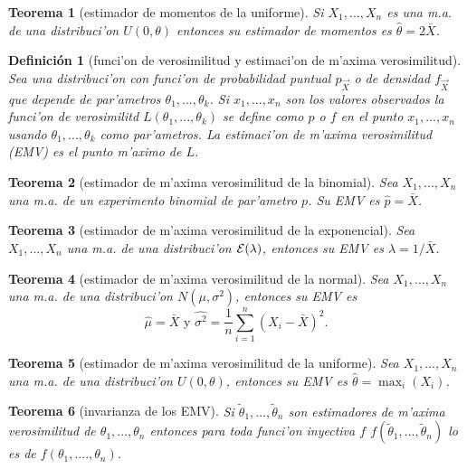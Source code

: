\documentclass[a4paper,spanish]{article}
\newcommand{\expon}[0]{{\cal E}}
\newtheorem{teo}{Teorema}
\newtheorem{defi}{Definici\'on}
\begin{document}
\begin{teo}[estimador de momentos de la uniforme]
Si $X_1,...,X_n$ es una m.a. de una distribuci'on $U(0,\theta)$ entonces
su estimador de momentos es $\hat{\theta} = 2\bar{X}$.
\end{teo}

\begin{defi}[funci'on de verosimilitud y estimaci'on de m'axima verosimilitud]
Sea una distribuci'on con funci'on de probabilidad puntual $p_{\vec{X}}$ o de
densidad $f_{\vec{X}}$ que depende de par'ametros $\theta_1,...,\theta_k$. Si
$x_1,...,x_n$ son los valores observados la \emph{funci'on de verosimilitd}
$L(\theta_1,...,\theta_k)$ se define como $p$ o $f$ en el punto $x_1,...,x_n$
usando $\theta_1,...,\theta_k$ como par'ametros. La \emph{estimaci'on de
m'axima verosimilitud (EMV)} es el punto m'aximo de $L$.
\end{defi}

\begin{teo}[estimador de m'axima verosimilitud de la binomial]
Sea $X_1,...,X_n$ una m.a. de un experimento binomial de par'ametro $p$.
Su EMV es $\hat{p} = \bar{X}$.
\end{teo}

\begin{teo}[estimador de m'axima verosimilitud de la exponencial]
Sea $X_1,...,X_n$ una m.a. de una distribuci'on $\expon(\lambda)$, entonces
su EMV es $\hat{\lambda} = 1 / \bar{X}$.
\end{teo}

\begin{teo}[estimador de m'axima verosimilitud de la normal]
Sea $X_1,...,X_n$ una m.a. de una distribuci'on $N(\mu,\sigma^2)$, entonces
su EMV es 
$$\hat{\mu} = \bar{X} \mbox{\ \ y \ \ } 
	\hat{\sigma^2} = \frac{1}{n} \sum_{i=1}^n (X_i - \bar{X})^2.$$
\end{teo}

\begin{teo}[estimador de m'axima verosimilitud de la uniforme]
Sea $X_1,...,X_n$ una m.a. de una distribuci'on $U(0,\theta)$, entonces
su EMV es $\hat{\theta} = \max_i(X_i)$.
\end{teo}

\begin{teo}[invarianza de los EMV]
Si $\tilde{\theta}_1,...,\tilde{\theta}_n$ son estimadores de m'axima
verosimilitud de $\theta_1,...,\theta_n$ entonces
para toda funci'on inyectiva $f$ $f(\tilde{\theta}_1,...,\tilde{\theta}_n)$ 
lo es de $f(\theta_1,....,\theta_n)$.
\end{teo}
\end{document}
